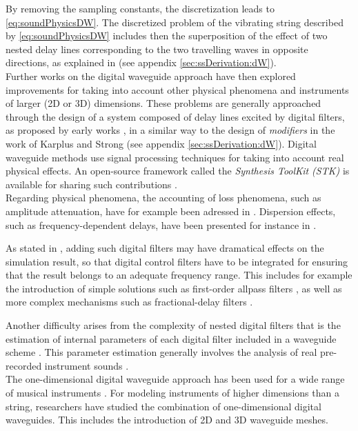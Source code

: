 {{By removing the sampling constants, the discretization leads to \myequname \eqref{eq:soundPhysicsDW}. The discretized problem of the vibrating string described by \myequname \eqref{eq:soundPhysicsDW} includes then the superposition of the effect of two nested delay lines corresponding to the two travelling waves in opposite directions, as explained in  (see appendix \ref{sec:ssDerivation:dW}).\\

Further works on the digital waveguide approach have then explored improvements for taking into account other physical phenomena and instruments of larger (2D or 3D) dimensions. These problems are generally approached through the design of a system composed of delay lines excited by digital filters, as proposed by early works , in a similar way to the design of \emph{modifiers} in the work of Karplus and Strong (see appendix \ref{sec:ssDerivation:dW}). Digital waveguide methods use signal processing techniques for taking into account real physical effects. An open-source framework called the \emph{Synthesis ToolKit (STK)} is available for sharing such contributions .\\

Regarding physical phenomena, the accounting of loss phenomena, such as amplitude attenuation, have for example been adressed in . Dispersion effects, such as frequency-dependent delays, have been presented for instance in .

As stated in , adding such digital filters may have dramatical effects on the simulation result, so that digital control filters have to be integrated for ensuring that the result belongs to an adequate frequency range. This includes for example the introduction of simple solutions such as first-order allpass filters , as well as more complex mechanisms such as fractional-delay filters .

Another difficulty arises from the complexity of nested digital filters that is the estimation of internal parameters of each digital filter included in a waveguide scheme . This parameter estimation generally involves the analysis of real pre-recorded instrument sounds .\\

The one-dimensional digital waveguide approach has been used for a wide range of musical instruments . For modeling instruments of higher dimensions than a string, researchers have studied the combination of one-dimensional digital waveguides. This includes the introduction of 2D  and 3D  waveguide meshes.

}}
